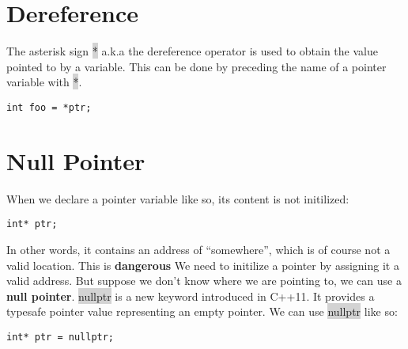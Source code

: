 \documentclass{report}
\begin{document}
\section{Dereference}
The asterisk sign \colorbox{lightgray}{*} a.k.a the dereference operator is used to obtain the value pointed to by a variable. This can be done by preceding the name of a pointer variable with \colorbox{lightgray}{*}.
\begin{verbatim}
int foo = *ptr;
\end{verbatim}
\section{Null Pointer}
When we declare a pointer variable like so, its content is not initilized:
\begin{verbatim}
int* ptr;
\end{verbatim}
In other words, it contains an address of ``somewhere'', which is of course not a valid location. This is \textbf{dangerous} We need to initilize a pointer by assigning it a valid address.
\bigbreak \noindent
But suppose we don't know where we are pointing to, we can use a \textbf{null pointer}.
\bigbreak \noindent
\colorbox{lightgray}{nullptr} is a new keyword introduced in C++11. It provides a typesafe pointer value representing an empty pointer.
\bigbreak \noindent
We can use \colorbox{lightgray}{nullptr} like so:
\begin{verbatim}
int* ptr = nullptr;
\end{verbatim}
\end{document}
